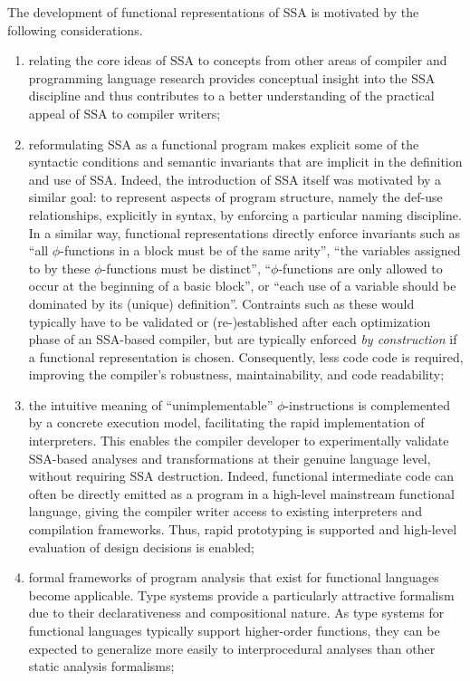 The development of functional representations of SSA is motivated by
the following considerations.

\begin{enumerate}
\item relating the core ideas of SSA to concepts from other
areas of compiler and programming language research provides
conceptual insight into the SSA discipline and thus contributes to a
better understanding of the practical appeal of SSA to compiler
writers;

\item
reformulating SSA as a functional program makes explicit some of the
syntactic conditions and semantic invariants that are implicit in
the definition and use of SSA. Indeed, the introduction of
SSA itself was motivated by a similar goal: to represent aspects of
program structure, namely the def-use relationships,
explicitly in syntax, by enforcing a particular naming discipline. In
a similar way, functional representations directly enforce
invariants such as ``all $\phi$-functions in a block must be of the
same arity'', ``the variables assigned to by these $\phi$-functions
must be distinct'', ``$\phi$-functions are only allowed to occur at
the beginning of a basic block'', or ``each use of a variable should
be dominated by its (unique) definition''. Contraints such as these
would typically have to be validated or (re-)established after each
optimization phase of an SSA-based compiler, but are typically
enforced \emph{by construction} if a functional representation is
chosen. Consequently, less code code is required, improving the
compiler's robustness, maintainability, and code readability;

\item the intuitive meaning of ``unimplementable'' $\phi$-instructions is
complemented by a concrete execution model, facilitating the rapid
implementation of interpreters. This enables the compiler developer to
experimentally validate SSA-based analyses and transformations at
their genuine language level, without requiring SSA
destruction. Indeed, functional intermediate code can often be
directly emitted as a program in a high-level mainstream functional
language, giving the compiler writer access to existing interpreters
and compilation frameworks. Thus, rapid prototyping is supported and
high-level evaluation of design decisions is enabled;

\item 
formal frameworks of program analysis that exist for functional
languages become applicable. Type systems provide a particularly
attractive formalism due to their declarativeness and compositional
nature. As type systems for functional languages typically support
higher-order functions, they can be expected to generalize more easily
to interprocedural analyses than other static analysis formalisms;


\end{enumerate}
